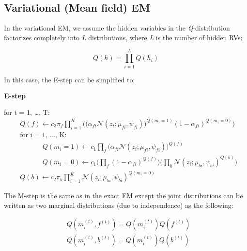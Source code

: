 \documentclass{article} %
\begin{document}
\subsection{Variational (Mean field) EM}
\label{variational_em}

In the variational EM, we assume the hidden variables in the \textit{Q}-distribution factorizes completely into \textit{L} distributions, where \textit{L} is the number of hidden RVs:

\begin{equation}
Q(h) = \prod_{i=1}^LQ(h_i) 
\label{eq:eq9}
\end{equation}

In this case, the E-step can be simplified to:

\textbf{E-step}

for t = 1, \ldots , T:
\begin{align*} 
&Q(f) \leftarrow c_3\pi_f\prod_{i=1}^K\Bigg(\Big(\alpha_{fi}\mathcal{N}(z_i;\mu_{fi},\psi_{fi})\Big)^{Q(m_i=1)} (1-\alpha_{fi})^{Q(m_i=0)} \Bigg) \\
&\text{for i = 1, \ldots , K: } \\
&\text{ }\text{ }\text{ }\text{ }\text{ }Q(m_i = 1) \leftarrow c_1\prod_{f}\Bigg(\alpha_{fi}\mathcal{N}(z_i;\mu_{fi},\psi_{fi})\Bigg)^{Q(f)}\\
&\text{ }\text{ }\text{ }\text{ }\text{ }Q(m_i = 0) \leftarrow c_1\Bigg(\prod_{f}(1-\alpha_{fi})^{Q(f)}\Bigg)\Bigg(\prod_{b}\mathcal{N}(z_i;\mu_{bi},\psi_{bi})^{Q(b)}\Bigg)\\
&Q(b) \leftarrow c_2\pi_b\prod_{i=1}^K\mathcal{N}(z_i;\mu_{bi},\psi_{bi})^{Q(m_i=0)}
\end{align*} 

The M-step is the same as in the exact EM except the joint distributions can be written as two marginal distributions (due to independence) as the following:

\begin{align*} 
&Q(m_i^{(t)},f^{(t)})  = Q(m_i^{(t)}) Q(f^{(t)}) \\
&Q(m_i^{(t)},b^{(t)})  = Q(m_i^{(t)}) Q(b^{(t)}) 
\end{align*} 
\end{document}
